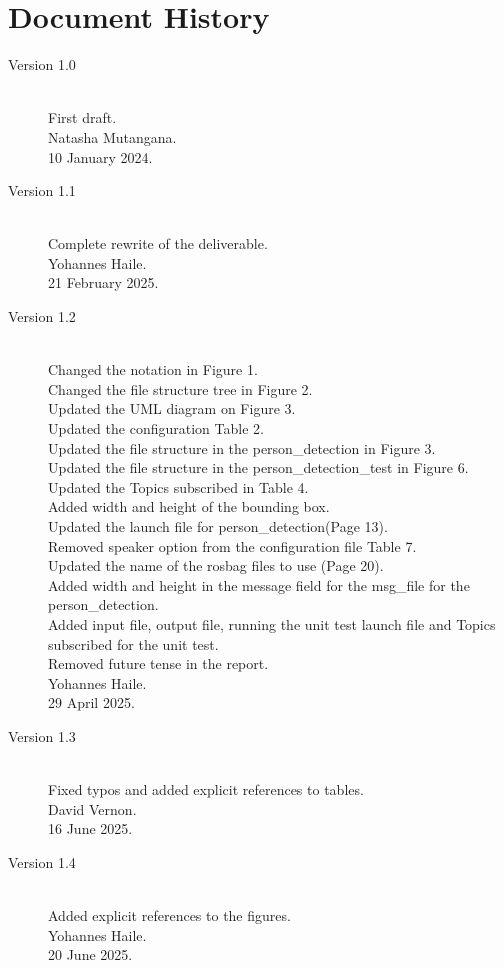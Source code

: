 \documentclass{CSSRforAfrica}
\begin{document}
  
\newpage
\section*{Document History}
\label{document_history}

\begin{description}
\item [Version 1.0]~\\
First draft.\\
Natasha Mutangana.\\
10 January 2024.

\item [Version 1.1]~\\
Complete rewrite of the deliverable.\\
Yohannes Haile. \\   
21 February 2025.   

\item [Version 1.2]~\\
Changed the notation in Figure 1.\\
Changed the file structure tree in Figure 2.\\
Updated the UML diagram on Figure 3. \\
Updated the configuration Table 2.\\
Updated the file structure in the person\_detection in Figure 3.\\
Updated the file structure in the person\_detection\_test in Figure 6.\\
Updated the Topics subscribed in Table 4. \\
Added width and height of the bounding box. \\
Updated the launch file for person\_detection(Page 13).\\
Removed speaker option from the configuration file Table 7. \\
Updated the name of the rosbag files to use (Page 20).\\
Added width and height in the message field for the msg\_file for the person\_detection.\\
Added input file, output file, running the unit test launch file and Topics subscribed for the unit test.\\
Removed future tense in the report.\\
Yohannes Haile. \\                                    
29 April 2025.  

\item [Version 1.3]~\\
Fixed typos and added explicit references to tables.\\
David Vernon. \\   
16 June 2025.  

\item [Version 1.4]~\\
Added explicit references to the figures.\\
Yohannes Haile.\\
20 June 2025.

 
\end{description}
\end{document}
